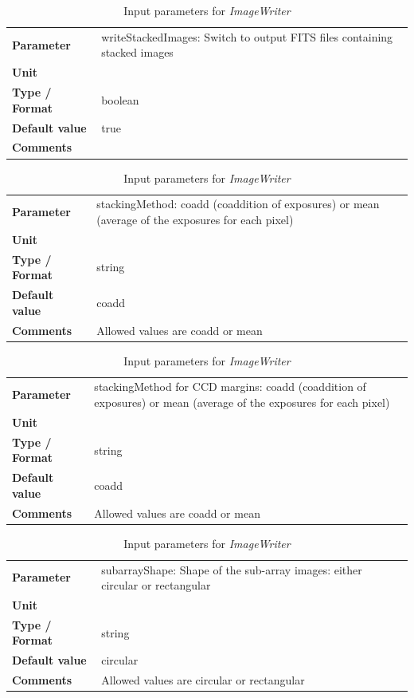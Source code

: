 \documentclass[11pt]{article}      %
\def\HCode#1{}
\def\htmlanchor#1{\HCode{<a id="#1"></a>}}
\begin{document}
\begin{table}[hb]
  \caption{Input parameters for {\it ImageWriter}}

  \htmlanchor{writeStackedImages}
  \begin{tabular}{| l | p{13cm} |}
    \hline 
    {\bf Parameter} & writeStackedImages: Switch to output FITS files containing stacked images\\
    {\bf Unit} & \\
    {\bf Type / Format} & boolean\\
    {\bf Default value} & true\\
    {\bf Comments} & \\
    \hline
  \end{tabular}
  \bigskip

  \htmlanchor{stackingMethod}
  \begin{tabular}{| l | p{13cm} |}
    \hline 
    {\bf Parameter} & stackingMethod: coadd (coaddition of exposures) or mean (average of the exposures for each pixel)\\
    {\bf Unit} & \\
    {\bf Type / Format} & string\\
    {\bf Default value} & coadd\\
    {\bf Comments} & Allowed values are coadd or mean\\
    \hline
  \end{tabular}
  \bigskip

  \htmlanchor{marginStackingMethod}
  \begin{tabular}{| l | p{13cm} |}
    \hline 
    {\bf Parameter} & stackingMethod for CCD margins: coadd (coaddition of exposures) or mean (average of the exposures for each pixel)\\
    {\bf Unit} & \\
    {\bf Type / Format} & string\\
    {\bf Default value} & coadd\\
    {\bf Comments} & Allowed values are coadd or mean\\
    \hline
  \end{tabular}
  \bigskip

  \htmlanchor{subarrayShape}
  \begin{tabular}{| l | p{13cm} |}
    \hline 
    {\bf Parameter} & subarrayShape: Shape of the sub-array images: either circular or rectangular\\
    {\bf Unit} & \\
    {\bf Type / Format} & string\\
    {\bf Default value} & circular\\
    {\bf Comments} & Allowed values are circular or rectangular\\
    \hline
  \end{tabular}
  \bigskip


\end{table}
\end{document}
